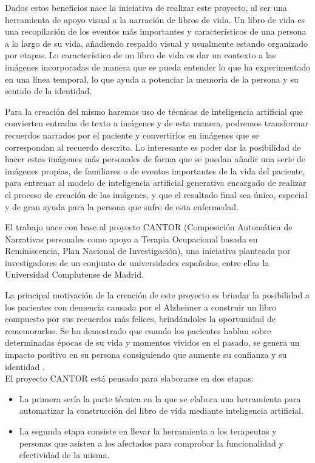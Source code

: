 Dados estos beneficios nace la iniciativa de realizar este proyecto, al ser una herramienta de apoyo visual a la narración de libros de vida. Un libro de vida es una recopilación de los eventos más importantes y característicos de una persona a lo largo de su vida, añadiendo respaldo visual y usualmente estando organizado por etapas. Lo característico de un libro de vida es dar un contexto a las imágenes incorporadas de manera que se pueda entender lo que ha experimentado en una línea temporal, lo que ayuda a potenciar la memoria de la persona y su sentido de la identidad. 

Para la creación del mismo haremos uso de técnicas de inteligencia artificial que convierten entradas de texto a imágenes y de esta manera, podremos transformar recuerdos narrados por el paciente y convertirlos en imágenes que se correspondan al recuerdo descrito. Lo interesante es poder dar la posibilidad de hacer estas imágenes más personales de forma que se puedan añadir una serie de imágenes propias, de familiares o de eventos importantes de la vida del paciente, para entrenar al modelo de inteligencia artificial generativa encargado de realizar el proceso de creación de las imágenes, y que el resultado final sea único, especial y de gran ayuda para la persona que sufre de esta enfermedad. 

El trabajo nace con base al proyecto CANTOR (Composición Automática de Narrativas personales como apoyo a Terapia Ocupacional basada en Reminiscencia, Plan Nacional de Investigación), una iniciativa planteada por investigadores de un conjunto de universidades españolas, entre ellas la Universidad Complutense de Madrid.

La principal motivación de la creación de este proyecto es brindar la posibilidad a los pacientes con demencia causada por el Alzheimer a construir un libro compuesto por sus recuerdos más felices, brindándoles la oportunidad de rememorarlos. Se ha demostrado que cuando los pacientes hablan sobre determinadas épocas de su vida y momentos vividos en el pasado, se genera un impacto positivo en su persona consiguiendo que aumente su confianza y su identidad \citep{UCMcantor}.\\

El proyecto CANTOR está pensado para elaborarse en dos etapas: 
\begin{itemize}
	\item La primera sería la parte técnica en la que se elabora una herramienta para automatizar la construcción del libro de vida mediante inteligencia artificial. 
	\item La segunda etapa consiste en llevar la herramienta a los terapeutas y personas que asisten a los afectados para comprobar la funcionalidad y efectividad de la misma. 
\end{itemize}

